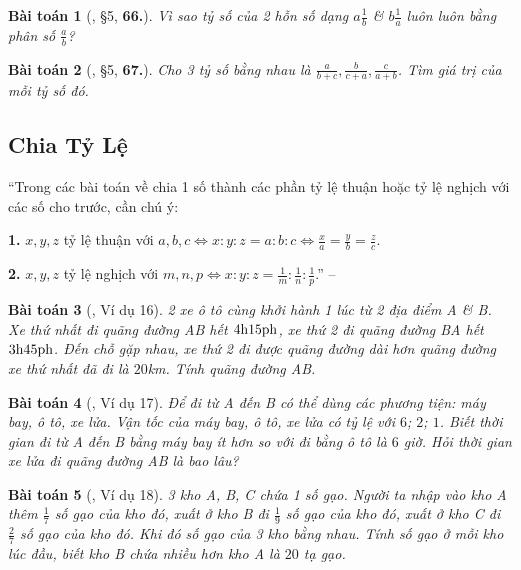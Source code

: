 \documentclass{article}
\numberwithin{equation}{section}
\newtheorem{baitoan}{Bài toán}[section]
\begin{document}
\begin{baitoan}[\cite{Binh_Toan_7_tap_1}, \S5, \textbf{66.}]
	Vì sao tỷ số của 2 hỗn số dạng $a\frac{1}{b}$ \& $b\frac{1}{a}$ luôn luôn bằng phân số $\frac{a}{b}$?
\end{baitoan}

\begin{baitoan}[\cite{Binh_Toan_7_tap_1}, \S5, \textbf{67.}]
	Cho 3 tỷ số bằng nhau là $\frac{a}{b + c},\frac{b}{c + a},\frac{c}{a + b}$. Tìm giá trị của mỗi tỷ số đó.
\end{baitoan}

\subsection{Chia Tỷ Lệ}
``Trong các bài toán về chia 1 số thành các phần tỷ lệ thuận hoặc tỷ lệ nghịch với các số cho trước, cần chú ý:
\begin{enumerate*}
	\item[\textbf{1.}] $x,y,z$ tỷ lệ thuận với $a,b,c\Leftrightarrow x:y:z = a:b:c\Leftrightarrow\frac{x}{a} = \frac{y}{b} = \frac{z}{c}$.
	\item[\textbf{2.}] $x,y,z$ tỷ lệ nghịch với $m,n,p\Leftrightarrow x:y:z = \frac{1}{m}:\frac{1}{n}:\frac{1}{p}$.'' -- \cite{Binh_Toan_7_tap_1}
\end{enumerate*}

\begin{baitoan}[\cite{Binh_Toan_7_tap_1}, Ví dụ 16]
	2 xe ô tô cùng khởi hành 1 lúc từ 2 địa điểm A \& B. Xe thứ nhất đi quãng đường AB hết $\rm4h15ph$, xe thứ 2 đi quãng đường BA hết $\rm3h45ph$. Đến chỗ gặp nhau, xe thứ 2 đi được quãng đường dài hơn quãng đường xe thứ nhất đã đi là $20$\emph{km}. Tính quãng đường AB.
\end{baitoan}

\begin{baitoan}[\cite{Binh_Toan_7_tap_1}, Ví dụ 17]
	Để đi từ A đến B có thể dùng các phương tiện: máy bay, ô tô, xe lửa. Vận tốc của máy bay, ô tô, xe lửa có tỷ lệ với $6$; $2$; $1$. Biết thời gian đi từ A đến B bằng máy bay ít hơn so với đi bằng ô tô là $6$ giờ. Hỏi thời gian xe lửa đi quãng đường AB là bao lâu?
\end{baitoan}

\begin{baitoan}[\cite{Binh_Toan_7_tap_1}, Ví dụ 18]
	3 kho A, B, C chứa 1 số gạo. Người ta nhập vào kho A thêm $\frac{1}{7}$ số gạo của kho đó, xuất ở kho B đi $\frac{1}{9}$ số gạo của kho đó, xuất ở kho C đi $\frac{2}{7}$ số gạo của kho đó. Khi đó số gạo của 3 kho bằng nhau. Tính số gạo ở mỗi kho lúc đầu, biết kho B chứa nhiều hơn kho A là $20$ tạ gạo.
\end{baitoan}
\end{document}
